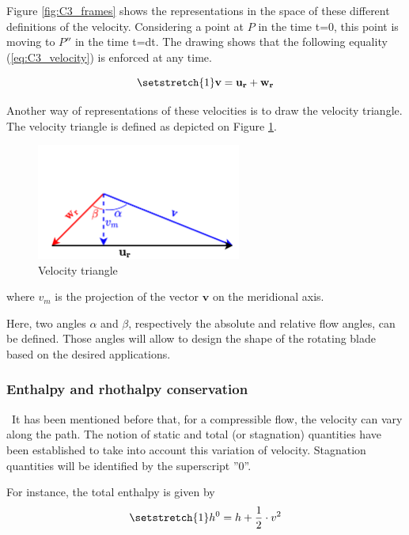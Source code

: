 Figure \ref{fig:C3_frames} shows the representations in the space of these different definitions of the velocity. Considering a point at $P$ in the time t=0, this point is moving to \(P''\) in the time t=dt.  
The drawing shows that the following equality (\ref{eq:C3_velocity}) is enforced at any time.

\begin{equation}
    \setstretch{1}
    \mathbf{v} = \mathbf{u_r} + \mathbf{w_r} \label{eq:C3_velocity}
\end{equation}

Another way of representations of these velocities is to draw the velocity triangle. The velocity triangle is defined as depicted on Figure \ref{fig:C3_vtriang}.

\begin{figure}[h]
    \centering
    \includegraphics[width=0.6\textwidth]{Vtriangle.png}
    \caption{Velocity triangle}
    \label{fig:C3_vtriang}
\end{figure}
where $v_m$ is the projection of the vector $\mathbf{v}$ on the meridional axis.

Here, two angles $\alpha$ and $\beta$, respectively the absolute and relative flow angles, can be defined. Those angles will allow to design the shape of the rotating blade based on the desired applications. 

\subsubsection{Enthalpy and rhothalpy conservation}
\quad\ It has been mentioned before that, for a compressible flow, the velocity can vary along the path. The notion of static and total (or stagnation) quantities have been established to take into account this variation of velocity. Stagnation quantities will be identified by the superscript ''0''.

For instance, the total enthalpy is given by
\begin{equation}
    \setstretch{1}
    h^0 = h + \frac{1}{2}\cdot v^2\label{eq:C3_h0}
\end{equation}

